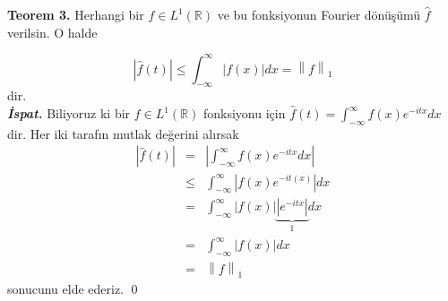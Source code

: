 \documentclass[a4paper, 9pt]{article}
\begin{document}
\textbf{Teorem 3.} Herhangi bir $f\in L^1(\mathbb{R})$ ve bu fonksiyonun Fourier dönüşümü $\widehat{f}$ verilsin. O halde

$$ \left| \widehat{f}(t) \right| \leq \int_{-\infty}^{\infty} \left| f(x) \right| dx = \left \| f \right \|_{1}  $$
dir. \\
\textit{\textbf{İspat.}} Biliyoruz ki bir $f \in L^1(\mathbb{R})$ fonksiyonu için $\widehat{f}(t) =  \int_{-\infty }^{\infty } f(x) e^{-itx}dx$ dir. Her iki tarafın mutlak değerini alırsak
	\begin{eqnarray*} 
		\left| \widehat{f}(t) \right| &=& \left| \int_{-\infty }^{\infty } f(x) e^{-itx}dx \right| \\
		&\leq &  \int_{-\infty }^{ \infty } \left| f(x)e^{-it(x)} \right| dx \\   
		&=& \int_{- \infty}^{\infty} \left| f(x) \right| \underbrace{\left| e^{-itx} \right| }_{1} dx \\
		&=& \int_{- \infty}^{\infty} \left| f(x) \right| dx \\
		&=& \left \| f \right \|_{1}
	\end{eqnarray*}
sonucunu elde ederiz. \qed
		
\end{document}
